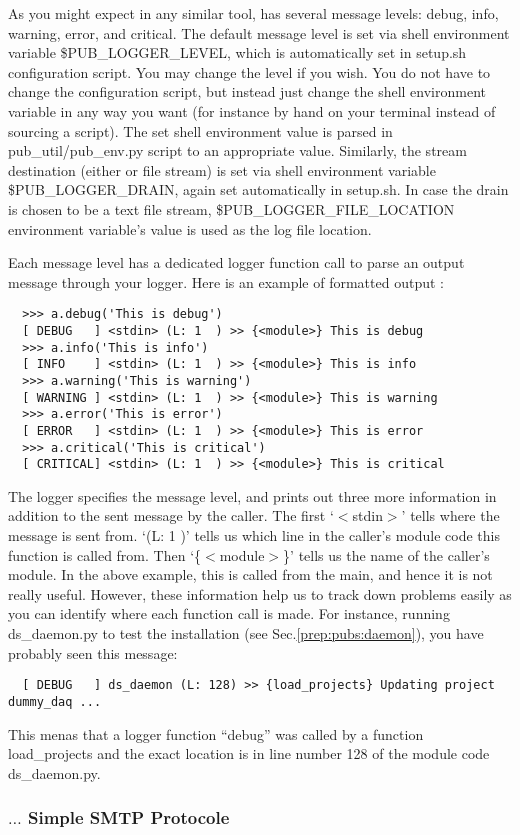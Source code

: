 As you might expect in any similar tool, {\publogger} has several message levels:
debug, info, warning, error, and critical. The default message level is set via
shell environment variable {\ttfamily \$PUB\_LOGGER\_LEVEL}, which is automatically
set in {\ttfamily setup.sh} configuration script. You may change the level if you
wish. You do not have to change the configuration script, but instead just change
the shell environment variable in any way you want (for instance by hand on your
terminal instead of sourcing a script). The set shell environment value is parsed 
in {\ttfamily pub\_util/pub\_env.py} script to an appropriate value. 
Similarly, the stream destination (either {\stdout} or file stream) is
set via shell environment variable {\ttfamily \$PUB\_LOGGER\_DRAIN}, again set
automatically in {\ttfamily setup.sh}. In case the drain is chosen to be a text
file stream, {\ttfamily \$PUB\_LOGGER\_FILE\_LOCATION} environment variable's value
is used as the log file location.

Each message level has a dedicated logger function call to parse an output message
through your logger. Here is an example of formatted output :
\begin{lstlisting}
  >>> a.debug('This is debug')
  [ DEBUG   ] <stdin> (L: 1  ) >> {<module>} This is debug
  >>> a.info('This is info')
  [ INFO    ] <stdin> (L: 1  ) >> {<module>} This is info
  >>> a.warning('This is warning')
  [ WARNING ] <stdin> (L: 1  ) >> {<module>} This is warning
  >>> a.error('This is error')
  [ ERROR   ] <stdin> (L: 1  ) >> {<module>} This is error
  >>> a.critical('This is critical')
  [ CRITICAL] <stdin> (L: 1  ) >> {<module>} This is critical
\end{lstlisting}
The logger specifies the message level, and prints out three more information in
addition to the sent message by the caller. The first `$<$stdin$>$' tells where the
message is sent from. `(L: 1  )' tells us which line in the caller's module code
this function is called from. Then `\{$<$module$>$\}' tells us the name of the
caller's module. In the above example, this is called from the main, and hence
it is not really useful. However, these information help us to track down problems
easily as you can identify where each function call is made. For instance, running
{\ttfamily ds\_daemon.py} to test the installation (see Sec.\ref{prep:pubs:daemon}),
you have probably seen this message:
\begin{lstlisting}
  [ DEBUG   ] ds_daemon (L: 128) >> {load_projects} Updating project dummy_daq ...
\end{lstlisting}
 This menas that a logger function ``debug'' was called by a function 
{\ttfamily load\_projects} and the exact location is in line number 128 of the 
module code {\ttfamily ds\_daemon.py}. 

\subsubsection{{\pubsmtp} $\ldots$ Simple SMTP Protocole}


\subsection{{\pubdbi}}

\subsection{{\dstream}}
